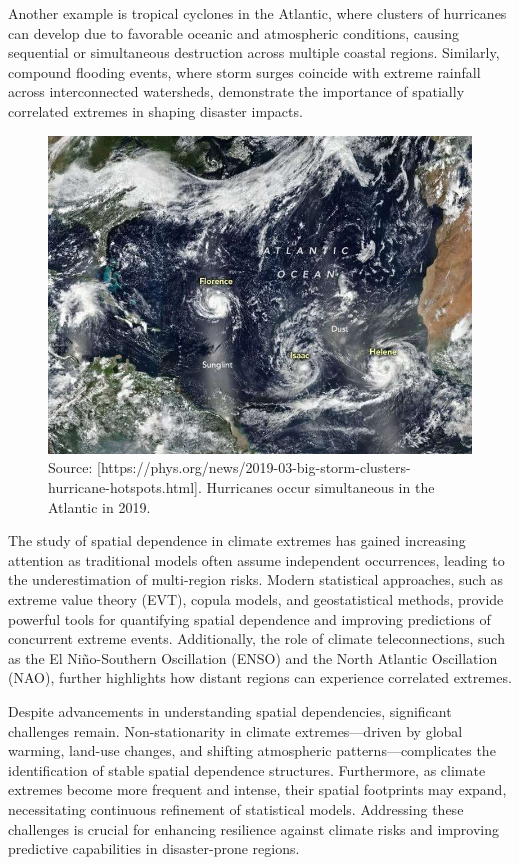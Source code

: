 \documentclass[
]{krantz}
\begin{document}
Another example is tropical cyclones in the Atlantic, where clusters of hurricanes can develop due to favorable oceanic and atmospheric conditions, causing sequential or simultaneous destruction across multiple coastal regions. Similarly, compound flooding events, where storm surges coincide with extreme rainfall across interconnected watersheds, demonstrate the importance of spatially correlated extremes in shaping disaster impacts.

\vspace{1em}
\begin{figure}

{\centering \includegraphics[width=0.8\linewidth]{work/06-anthropo/figures/atlantic} 

}

\caption{Source: [https://phys.org/news/2019-03-big-storm-clusters-hurricane-hotspots.html]. Hurricanes occur simultaneous in the Atlantic in 2019.}\label{fig:unnamed-chunk-5}
\end{figure}
\vspace{1em}

The study of spatial dependence in climate extremes has gained increasing attention as traditional models often assume independent occurrences, leading to the underestimation of multi-region risks. Modern statistical approaches, such as extreme value theory (EVT), copula models, and geostatistical methods, provide powerful tools for quantifying spatial dependence and improving predictions of concurrent extreme events. Additionally, the role of climate teleconnections, such as the El Niño-Southern Oscillation (ENSO) and the North Atlantic Oscillation (NAO), further highlights how distant regions can experience correlated extremes.

Despite advancements in understanding spatial dependencies, significant challenges remain. Non-stationarity in climate extremes---driven by global warming, land-use changes, and shifting atmospheric patterns---complicates the identification of stable spatial dependence structures. Furthermore, as climate extremes become more frequent and intense, their spatial footprints may expand, necessitating continuous refinement of statistical models. Addressing these challenges is crucial for enhancing resilience against climate risks and improving predictive capabilities in disaster-prone regions.
\end{document}
